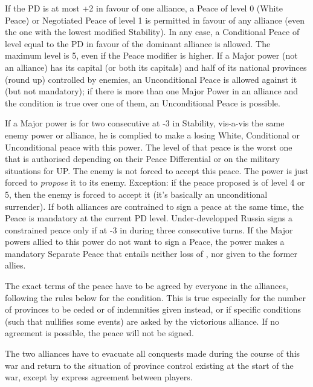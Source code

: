 \bparag If the PD is at most +2 in favour of one alliance, a Peace of level 0
(White Peace) or Negotiated Peace of level 1 is permitted in favour of any
alliance (even the one with the lowest modified Stability).
\bparag In any case, a Conditional Peace of level equal to the PD in favour of
the dominant alliance is allowed. The maximum level is 5, even if the Peace
modifier is higher.
\bparag If a Major power (not an alliance) has its capital (or both its
capitals) and half of its national provinces (round up) controlled by enemies,
an Unconditional Peace is allowed against it (but not mandatory); if there is
more than one Major Power in an alliance and the condition is true over one of
them, an Unconditional Peace is possible.

 If a Major power is for two consecutive at -3 in
Stability, vis-a-vis the same enemy power or alliance, he is complied to make
a losing White, Conditional or Unconditional peace with this power. The level
of that peace is the worst one that is authorised depending on their Peace
Differential or on the military situations for UP.
\bparag The enemy is not forced to accept this peace. The power is just forced
to \emph{propose} it to its enemy. Exception: if the peace proposed is of
level 4 or 5, then the enemy is forced to accept it (it's basically an
unconditional surrender).
\bparag If both alliances are contrained to sign a peace at the same time, the
Peace is mandatory at the current PD level.
\bparag Under-developped Russia signs a constrained peace only if at -3 in
\STAB during three consecutive turns.
\bparag If the Major powers allied to this power do not want to sign a Peace,
the power makes a mandatory Separate Peace that entails neither loss of \STAB,
nor \CB given to the former allies.

The exact terms of the peace have to be agreed by everyone in the alliances,
following the rules below for the condition. This is true especially for the
number of provinces to be ceded or of indemnities given instead, or if
specific conditions (such that nullifies some events) are asked by the
victorious alliance. If no agreement is possible, the peace will not be
signed.

The two alliances have to evacuate all conquests made during the course of
this war and return to the situation of province control existing at the start
of the war, except by express agreement between players.

